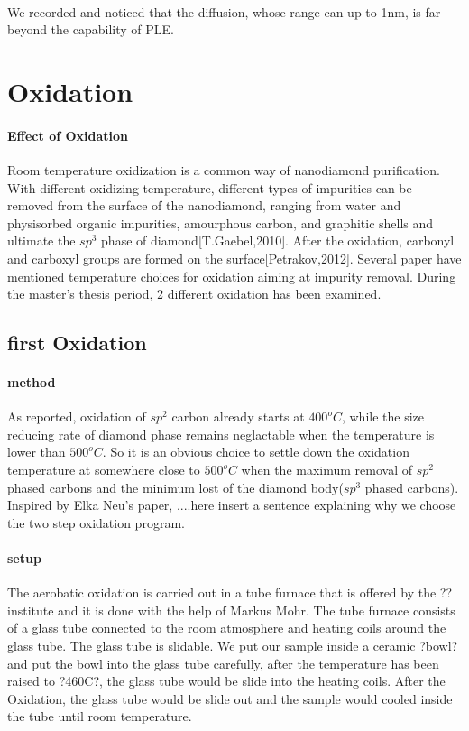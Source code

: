 \paragraph{}We recorded and noticed that the diffusion, whose range can up to 1nm, is far beyond the capability of PLE. 

\section{Oxidation}
\paragraph{Effect of Oxidation}
Room temperature oxidization is a common way of nanodiamond purification. With different oxidizing temperature, different types of impurities can be removed from the surface of the nanodiamond, ranging from water and physisorbed organic impurities, amourphous carbon, and graphitic shells and ultimate the $sp^{3}$ phase of diamond[T.Gaebel,2010]. After the oxidation, carbonyl and carboxyl groups are formed on the surface[Petrakov,2012]. Several paper have mentioned temperature choices for oxidation aiming at impurity removal. During the master's thesis period, 2 different oxidation has been examined.

\subsection[first Oxidation]{first Oxidation}
\paragraph{method}As reported, oxidation of $sp^{2}$ carbon already starts at $400^{o}C$, while the size reducing rate of diamond phase remains neglactable when the temperature is lower than $500^{o}C$. So it is an obvious choice to settle down the oxidation temperature at somewhere close to $500^{o}C$ when the maximum removal of $sp^{2}$ phased carbons and the minimum lost of the diamond body($sp^{3}$ phased carbons). Inspired by Elka Neu's paper, ....here insert a sentence explaining why we choose the two step oxidation program.
\paragraph{setup}

The aerobatic oxidation is carried out in a tube furnace that is offered by the ?? institute and it is done with the help of Markus Mohr. The tube furnace consists of a glass tube connected to the room atmosphere and heating coils around the glass tube. The glass tube is slidable. We put our sample inside a ceramic ?bowl? and put the bowl into the glass tube carefully, after the temperature has been raised to ?460C?, the glass tube would be slide into the heating coils. After the Oxidation, the glass tube would be slide out and the sample would cooled inside the tube until room temperature.

